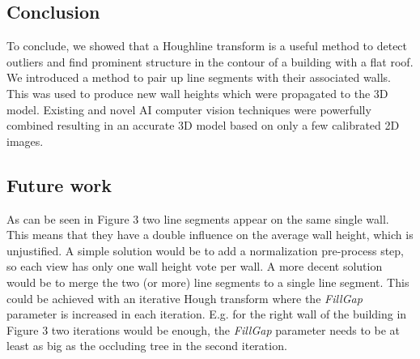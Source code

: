 \documentclass[10pt]{article}
\begin{document}
{%

\subsection{Conclusion}


To conclude, we showed that a Houghline transform is a useful method to detect outliers and find prominent structure in the contour of a building with a flat roof. We introduced a method to pair up line segments with their associated walls. This was used to produce new wall heights which were propagated to the 3D model.
Existing and novel AI computer vision techniques were powerfully combined resulting in an accurate 3D model based on only a few calibrated 2D images. 

\subsection{Future work}
As can be seen in Figure 3
two line segments appear on the same single wall. This means that they have a double
influence on the average wall height, which is unjustified. 
A simple solution would be to add a normalization pre-process step, so each view
has only one wall height vote per wall. A more decent solution would be to
merge the two (or more) line segments to a single line segment. This could be
achieved with an iterative Hough transform where the \emph{FillGap} parameter is
increased in each iteration. E.g. for the right wall of the building in Figure 3  %
two iterations would be enough, the \emph{FillGap} parameter needs to be at least as big as the occluding tree in the second iteration.\\

}
\end{document}
